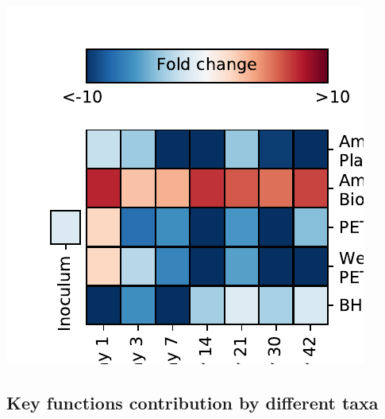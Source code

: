 \documentclass[
]{article}
\begin{document}
\includegraphics{20-6-15-PET-plastisphere-PICRUSt2_files/figure-latex/plot_fc_K01032-1.pdf}

\hypertarget{key-functions-contribution-by-different-taxa}{%
\subsection{Key functions contribution by different
taxa}\label{key-functions-contribution-by-different-taxa}}
\end{document}
